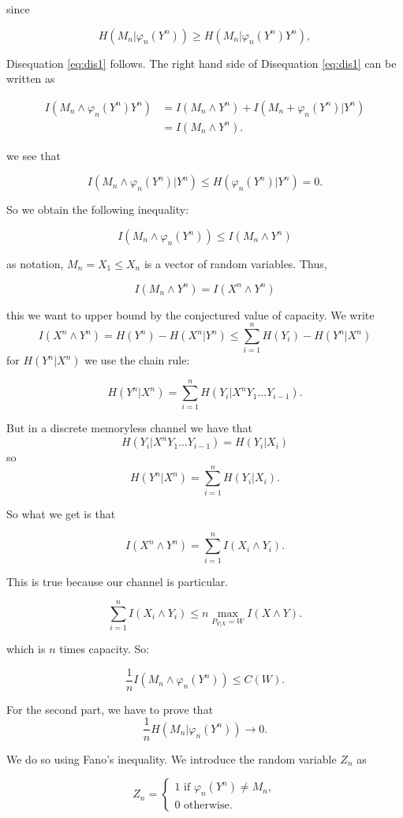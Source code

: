 since

\[
 H(M_n|\varphi_n(Y^n)) \geq H(M_n|\varphi_n(Y^n)Y^n),
\]

Disequation \ref{eq:dis1} follows. The right hand side of Disequation \ref{eq:dis1} can be written as

\begin{align*}
 I(M_n \wedge \varphi_n(Y^n)Y^n) & = I(M_n \wedge Y^n) + I(M_n + \varphi_n(Y^n)|Y^n) \\ & = I(M_n \wedge Y^n).
\end{align*}

we see that

\[
 I(M_n \wedge \varphi_n(Y^n)|Y^n) \leq H(\varphi_n(Y^n)|Y^n) = 0.
\]

So we obtain the following inequality:

\[
I(M_n \wedge \varphi_n(Y^n)) \leq I(M_n \wedge Y^n) 
\]

as notation, $M_n = X_1 \leq X_n$ is a vector of random variables. Thus,

\[
 I(M_n \wedge Y^n) = I(X^n \wedge Y^n)
\]

this we want to upper bound by the conjectured value of capacity. We write
\[
 I(X^n \wedge Y^n) = H(Y^n) -H(X^n |Y^n) \leq \sum_{i=1}^n H(Y_i) - H(Y^n | X^n)
\]
for $H(Y^n | X^n)$ we use the chain rule:

\[
 H(Y^n | X^n) = \sum_{i=1}^n H(Y_i | X^nY_1\ldots Y_{i-1}).
\]

But in a discrete memoryless channel we have that
\[
 H(Y_i | X^nY_1\ldots Y_{i-1}) = H(Y_i |X_i)
\]
so
\[
 H(Y^n |X^n) = \sum_{i=1}^nH(Y_i|X_i).
\]

So what we get is that

\[
 I(X^n \wedge Y^n) = \sum_{i=1}^n I(X_i \wedge Y_i).
\]

This is true because our channel is particular.

\[
 \sum_{i=1}^n I(X_i \wedge Y_i) \leq n \max_{P_{Y|X} = W}I(X \wedge Y).
\]

which is $n$ times capacity. So:

\[
 \dfrac{1}{n}I(M_n \wedge \varphi_n(Y^n)) \leq C(W).
\]

For the second part, we have to prove that 
\[
 \dfrac{1}{n}H(M_n|\varphi_n(Y^n)) \rightarrow 0.
\]

We do so using Fano's inequality. We introduce the random variable $Z_n$ as

\begin{equation*}
Z_n = \begin{cases}
1 \text{ if }\varphi_n(Y^n) \not=M_n,\\
0  \text{ otherwise.}
\end{cases} 
\end{equation*}

